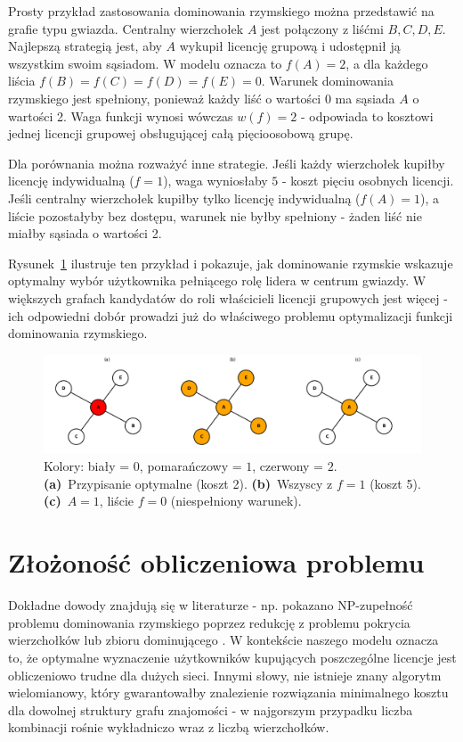 Prosty przykład zastosowania dominowania rzymskiego można przedstawić na grafie typu gwiazda. Centralny wierzchołek $A$ jest połączony z liśćmi $B, C, D, E$. Najlepszą strategią jest, aby $A$ wykupił licencję grupową i udostępnił ją wszystkim swoim sąsiadom. W modelu oznacza to $f(A)=2$, a dla każdego liścia $f(B)=f(C)=f(D)=f(E)=0$. Warunek dominowania rzymskiego jest spełniony, ponieważ każdy liść o wartości 0 ma sąsiada $A$ o wartości 2. Waga funkcji wynosi wówczas $w(f)=2$ - odpowiada to kosztowi jednej licencji grupowej obsługującej całą pięcioosobową grupę.

Dla porównania można rozważyć inne strategie. Jeśli każdy wierzchołek kupiłby licencję indywidualną ($f=1$), waga wyniosłaby $5$ - koszt pięciu osobnych licencji. Jeśli centralny wierzchołek kupiłby tylko licencję indywidualną ($f(A)=1$), a liście pozostałyby bez dostępu, warunek nie byłby spełniony - żaden liść nie miałby sąsiada o wartości 2.

Rysunek~\ref{fig:romandomatinonstarexamepl} ilustruje ten przykład i pokazuje, jak dominowanie rzymskie wskazuje optymalny wybór użytkownika pełniącego rolę lidera w centrum gwiazdy. W większych grafach kandydatów do roli właścicieli licencji grupowych jest więcej - ich odpowiedni dobór prowadzi już do właściwego problemu optymalizacji funkcji dominowania rzymskiego.


\begin{figure}[H]
  \centering
  \includegraphics[width=1\textwidth]{assets/stars.png}
  \caption{
    Kolory: biały = $0$, pomarańczowy = $1$, czerwony = $2$.
    \textbf{(a)}~Przypisanie optymalne (koszt 2).
    \textbf{(b)}~Wszyscy z $f=1$ (koszt 5).
    \textbf{(c)}~$A=1$, liście $f=0$ (niespełniony warunek).
  }
  \label{fig:romandomatinonstarexamepl}
\end{figure}


\section{Złożoność obliczeniowa problemu}

Dokładne dowody znajdują się w literaturze - np. pokazano NP-zupełność problemu dominowania rzymskiego poprzez redukcję z problemu pokrycia wierzchołków lub zbioru dominującego \cite{chambers2009}. W kontekście naszego modelu oznacza to, że optymalne wyznaczenie użytkowników kupujących poszczególne licencje jest obliczeniowo trudne dla dużych sieci. Innymi słowy, nie istnieje znany algorytm wielomianowy, który gwarantowałby znalezienie rozwiązania minimalnego kosztu dla dowolnej struktury grafu znajomości - w najgorszym przypadku liczba kombinacji rośnie wykładniczo wraz z liczbą wierzchołków.


